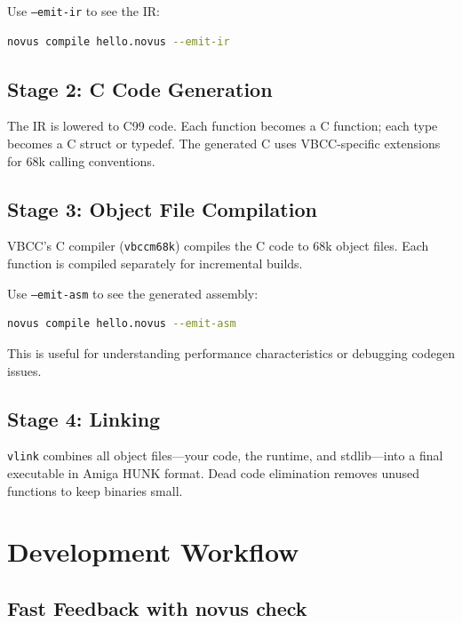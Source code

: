 Use \texttt{--emit-ir} to see the IR:

\begin{lstlisting}[language=bash]
novus compile hello.novus --emit-ir
\end{lstlisting}

\subsection{Stage 2: C Code Generation}

The IR is lowered to C99 code. Each function becomes a C function; each type becomes a C struct or typedef. The generated C uses VBCC-specific extensions for 68k calling conventions.

\subsection{Stage 3: Object File Compilation}

VBCC's C compiler (\texttt{vbccm68k}) compiles the C code to 68k object files. Each function is compiled separately for incremental builds.

Use \texttt{--emit-asm} to see the generated assembly:

\begin{lstlisting}[language=bash]
novus compile hello.novus --emit-asm
\end{lstlisting}

This is useful for understanding performance characteristics or debugging codegen issues.

\subsection{Stage 4: Linking}

\texttt{vlink} combines all object files---your code, the runtime, and stdlib---into a final executable in Amiga HUNK format. Dead code elimination removes unused functions to keep binaries small.

\section{Development Workflow}
\label{sec:dev-workflow}

\subsection{Fast Feedback with novus check}

